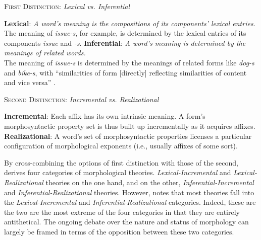 \begin{exe}
\ex \textsc{First Distinction}: \textit{Lexical vs. Inferential} 
\begin{xlist}
	\ex \textbf{Lexical}: \textit{A word's meaning is the compositions of its components' lexical entries.}\\
	The meaning of \textit{issue-s}, for example, is determined by the lexical entries of its components \textit{issue} and \textit{-s}.
	\ex \textbf{Inferential}: \textit{A word's meaning is determined by the meanings of related words.}\\
	The meaning of \textit{issue-s} is determined by the meanings of related forms like \textit{dog-s} and \textit{bike-s},
with ``similarities of form [directly] reflecting similarities of content and vice versa'' \citep[][p. 2]{anderson:2015shorthist}. \label{ex:d-one-b}
	\end{xlist}
\ex \textsc{Second Distinction}: \textit{Incremental vs. Realizational} 
\begin{xlist} 
	\ex \textbf{Incremental}: Each affix has its own intrinsic meaning. 
	A form's morphosyntactic property set is thus built up incrementally as it acquires affixes.
	\label{ex:d-two-a}
	\ex \textbf{Realizational}: A word's set of morphosyntactic properties 
	licenses a particular configuration of morphological exponents 
	(i.e., usually affixes of some sort). 
	\end{xlist}
\end{exe}

By cross-combining the options of first distinction with those of the second, 
\cite{stump:2001} derives four categories of morphological theories. 
\emph{Lexical-Incremental} and \emph{Lexical-Realizational} theories 
on the one hand, and on the other, \emph{Inferential-Incremental} and 
\emph{Inferential-Realizational} theories. However, \citet{anderson:2017} 
notes that most theories fall into the \emph{Lexical-Incremental} and 
\emph{Inferential-Realizational} categories. Indeed, these are the two are 
the most extreme of the four categories in that they are entirely antithetical. 
The ongoing debate over the nature and status of morphology can largely 
be framed in terms of the opposition between these two categories. 

